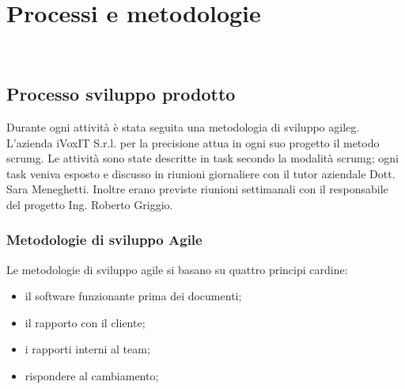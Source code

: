 
\chapter{Processi e metodologie}
\label{cap:processi-metodologie}

\\

\section{Processo sviluppo prodotto}
Durante ogni attività è stata seguita una metodologia di sviluppo \gls{agileg}. L'azienda iVoxIT S.r.l. per la precisione attua in ogni suo progetto il metodo \gls{scrumg}. Le attività sono state descritte in task secondo la modalità \gls{scrumg}; ogni task veniva esposto e discusso in riunioni giornaliere con il tutor aziendale Dott. Sara Meneghetti. Inoltre erano previste riunioni settimanali con il responsabile del progetto Ing. Roberto Griggio.

\subsection{Metodologie di sviluppo Agile}
Le metodologie di sviluppo agile si basano su quattro principi cardine:
\begin{itemize}
    \item il software funzionante prima dei documenti;
    \item il rapporto con il cliente;
    \item i rapporti interni al team;
    \item rispondere al cambiamento;
\end{itemize}


